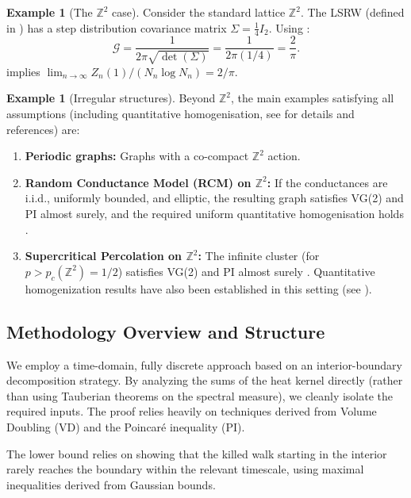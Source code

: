 \documentclass{article}
\numberwithin{equation}{section}
\theoremstyle{definition}
\newtheorem{example}[theorem]{Example}
\theoremstyle{remark}
\newcommand{\cG}{\mathcal{G}}
\begin{document}
\begin{example}[The $\mathbb{Z}^2$ case]\label{rem:pi2}
Consider the standard lattice $\mathbb{Z}^2$. The LSRW (defined in ) has a step distribution covariance matrix $\Sigma = \frac{1}{4} I_2$. Using :
\[
\cG = \frac{1}{2\pi \sqrt{\det(\Sigma)}} = \frac{1}{2\pi (1/4)} = \frac{2}{\pi}.
\]
 implies $\lim_{n \to \infty} Z_n(1) / (N_n \log N_n) = 2/\pi$.
\end{example}

\begin{example}[Irregular structures]\label{ex:irregular}
Beyond $\mathbb{Z}^2$, the main examples satisfying all assumptions (including quantitative homogenisation, see  for details and references) are:
\begin{enumerate}
    \item \textbf{Periodic graphs:} Graphs with a co-compact $\mathbb{Z}^2$ action.
    \item \textbf{Random Conductance Model (RCM) on $\mathbb{Z}^2$:} If the conductances are i.i.d., uniformly bounded, and elliptic, the resulting graph satisfies VG(2) and PI almost surely, and the required uniform quantitative homogenisation holds \cite{Biskup11, AndresDeuschelSlowik19}.
    \item \textbf{Supercritical Percolation on $\mathbb{Z}^2$:} The infinite cluster (for $p>p_c(\mathbb{Z}^2)=1/2$) satisfies VG(2) and PI almost surely \cite{Barlow04}. Quantitative homogenization results have also been established in this setting (see ).
\end{enumerate}
\end{example}


\subsection{Methodology Overview and Structure}
We employ a time-domain, fully discrete approach based on an interior-boundary decomposition strategy. By analyzing the sums of the heat kernel directly (rather than using Tauberian theorems on the spectral measure), we cleanly isolate the required inputs. The proof relies heavily on techniques derived from Volume Doubling (VD) and the Poincaré inequality (PI).

The lower bound relies on showing that the killed walk starting in the interior rarely reaches the boundary within the relevant timescale, using maximal inequalities derived from Gaussian bounds.
\end{document}
